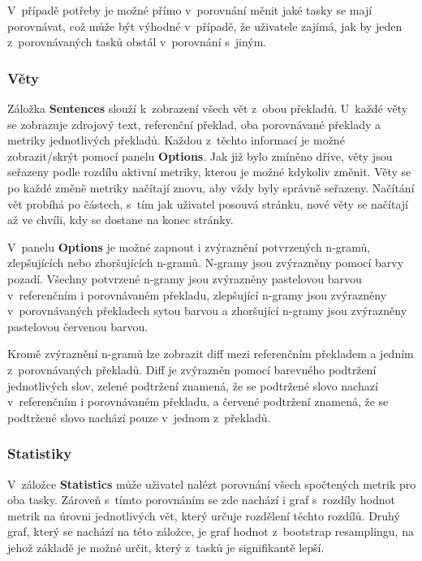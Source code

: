 V~případě potřeby je možné přímo v~porovnání měnit jaké tasky se mají porovnávat,
  což může být výhodné v~případě,
  že uživatele zajímá,
  jak by jeden z~porovnávaných tasků obstál v~porovnání s~jiným.

\subsubsection{Věty}
Záložka \textbf{Sentences} slouží k~zobrazení všech vět z~obou překladů.
U~každé věty se zobrazuje zdrojový text,
  referenční překlad, oba porovnávané překlady
  a metriky jednotlivých překladů.
Každou z~těchto informací je možné zobrazit/skrýt pomocí panelu \textbf{Options}.
Jak již bylo zmíněno dříve,
  věty jsou seřazeny podle rozdílu aktivní metriky,
  kterou je možné kdykoliv změnit.
Věty se po každé změně metriky načítají znovu,
  aby vždy byly správně seřazeny.
Načítání vět probíhá po částech,
  s~tím jak uživatel posouvá stránku,
  nové věty se načítají až ve chvíli,
  kdy se dostane na konec stránky.

V~panelu \textbf{Options} je možné zapnout i zvýraznění potvrzených \mbox{n-gramů}, zlepšujících nebo zhoršujících \mbox{n-gramů}.
N-gramy jsou zvýrazněny pomocí barvy pozadí.
Všechny potvrzené \mbox{n-gramy} jsou zvýrazněny pastelovou barvou v~referenčním i porovnávaném překladu,
  zlepšující \mbox{n-gramy} jsou zvýrazněny v~porovnávaných překladech sytou barvou
  a zhoršující \mbox{n-gramy} jsou zvýrazněny pastelovou červenou barvou.

Kromě zvýraznění \mbox{n-gramů} lze zobrazit diff mezi referenčním překladem a jedním z~porovnávaných překladů.
Diff je zvýrazněn pomocí barevného podtržení jednotlivých slov,
  zelené podtržení znamená, že se podtržené slovo nachazí v~referenčním i porovnávaném překladu,
  a červené podtržení znamená, že se podtržené slovo nachází pouze v~jednom z~překladů.

\subsubsection{Statistiky}
V~záložce \textbf{Statistics} může uživatel nalézt porovnání všech spočtených metrik pro oba tasky.
Zároveň s~tímto porovnáním se zde nachází i graf s~rozdíly hodnot metrik na úrovni jednotlivých vět,
  který určuje rozdělení těchto rozdílů.
Druhý graf, který se nachází na této záložce,
  je graf hodnot z~bootstrap resamplingu,
  na jehož základě je možné určit,
  který z~tasků je signifikantě lepší.

